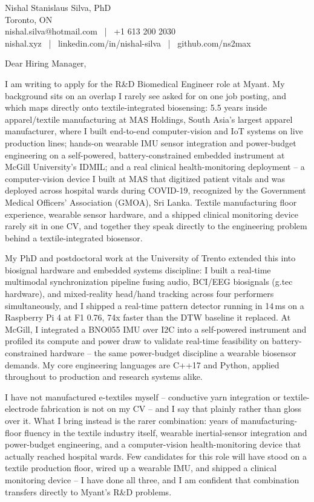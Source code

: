 \documentclass[11pt]{article}
\begin{document}
\pagestyle{empty}

\noindent
Nishal Stanislaus Silva, PhD \\
Toronto, ON \\
nishal.silva@hotmail.com \, | \, +1 613 200 2030 \\
nishal.xyz \, | \, linkedin.com/in/nishal-silva \, | \, github.com/ns2max

\vspace{1em}
\noindent Dear Hiring Manager,

\vspace{0.5em}
\noindent I am writing to apply for the R\&D Biomedical Engineer role at Myant. My background sits on an overlap I rarely see asked for on one job posting, and which maps directly onto textile-integrated biosensing: 5.5 years inside apparel/textile manufacturing at MAS Holdings, South Asia's largest apparel manufacturer, where I built end-to-end computer-vision and IoT systems on live production lines; hands-on wearable IMU sensor integration and power-budget engineering on a self-powered, battery-constrained embedded instrument at McGill University's IDMIL; and a real clinical health-monitoring deployment -- a computer-vision device I built at MAS that digitized patient vitals and was deployed across hospital wards during COVID-19, recognized by the Government Medical Officers' Association (GMOA), Sri Lanka. Textile manufacturing floor experience, wearable sensor hardware, and a shipped clinical monitoring device rarely sit in one CV, and together they speak directly to the engineering problem behind a textile-integrated biosensor.

\vspace{0.5em}
\noindent My PhD and postdoctoral work at the University of Trento extended this into biosignal hardware and embedded systems discipline: I built a real-time multimodal synchronization pipeline fusing audio, BCI/EEG biosignals (g.tec hardware), and mixed-reality head/hand tracking across four performers simultaneously, and I shipped a real-time pattern detector running in 14\,ms on a Raspberry Pi 4 at F1 0.76, 74x faster than the DTW baseline it replaced. At McGill, I integrated a BNO055 IMU over I2C into a self-powered instrument and profiled its compute and power draw to validate real-time feasibility on battery-constrained hardware -- the same power-budget discipline a wearable biosensor demands. My core engineering languages are C++17 and Python, applied throughout to production and research systems alike.

\vspace{0.5em}
\noindent I have not manufactured e-textiles myself -- conductive yarn integration or textile-electrode fabrication is not on my CV -- and I say that plainly rather than gloss over it. What I bring instead is the rarer combination: years of manufacturing-floor fluency in the textile industry itself, wearable inertial-sensor integration and power-budget engineering, and a computer-vision health-monitoring device that actually reached hospital wards. Few candidates for this role will have stood on a textile production floor, wired up a wearable IMU, and shipped a clinical monitoring device -- I have done all three, and I am confident that combination transfers directly to Myant's R\&D problems.
\end{document}
